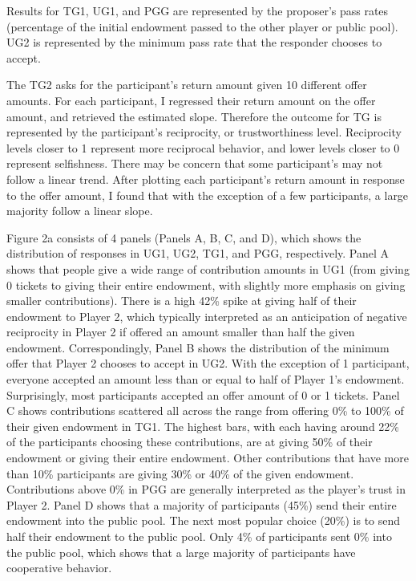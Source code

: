 \documentclass{article}
\begin{document}
Results for TG1, UG1, and PGG are represented by the proposer\rq s pass rates (percentage of the initial endowment passed to the other player or public pool). UG2 is represented by the minimum pass rate that the responder chooses to accept. 

The TG2 asks for the participant\rq s return amount given 10 different offer amounts. For each participant, I regressed their return amount on the offer amount, and retrieved the estimated slope. Therefore the outcome for TG is represented by the participant\rq s reciprocity, or trustworthiness level. Reciprocity levels closer to 1 represent more reciprocal behavior, and lower levels closer to 0 represent selfishness. There may be concern that some participant\rq s may not follow a linear trend. After plotting each participant\rq s return amount in response to the offer amount, I found that with the exception of a few participants, a large majority follow a linear slope.

Figure 2a consists of 4 panels (Panels A, B, C, and D), which shows the distribution of responses in UG1, UG2, TG1, and PGG, respectively. Panel A shows that people give a wide range of contribution amounts in UG1 (from giving 0 tickets to giving their entire endowment, with slightly more emphasis on giving smaller contributions). There is a high 42\% spike at giving half of their endowment to Player 2, which typically interpreted as an anticipation of negative reciprocity in Player 2 if offered an amount smaller than half the given endowment. Correspondingly, Panel B shows the distribution of the minimum offer that Player 2 chooses to accept in UG2. With the exception of 1 participant, everyone accepted an amount less than or equal to half of Player 1's endowment. Surprisingly, most participants accepted an offer amount of 0 or 1 tickets. Panel C shows contributions scattered all across the range from offering 0\% to 100\% of their given endowment in TG1. The highest bars, with each having around 22\% of the participants choosing these contributions, are at giving 50\% of their endowment or giving their entire endowment. Other contributions that have more than 10\% participants are giving 30\% or 40\% of the given endowment. Contributions above 0\% in PGG are generally interpreted as the player\rq s trust in Player 2. Panel D shows that a majority of participants (45\%) send their entire endowment into the public pool. The next most popular choice (20\%) is to send half their endowment to the public pool. Only 4\% of participants sent 0\% into the public pool, which shows that a large majority of participants have cooperative behavior.
\end{document}

